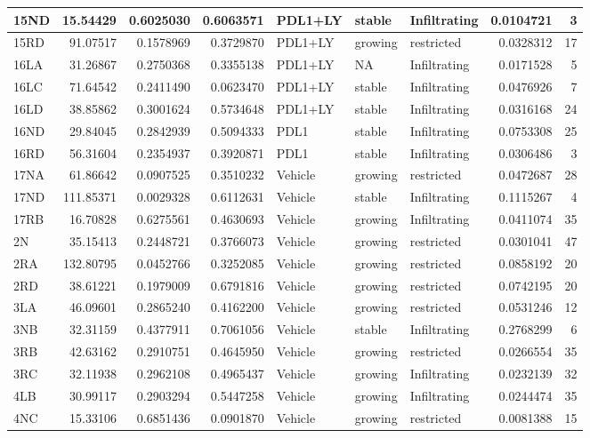 \documentclass[
]{book}
\begin{document}
\begin{tabular}{l|r|r|r|l|l|l|r|r}
\hline
15ND & 15.54429 & 0.6025030 & 0.6063571 & PDL1+LY & stable & Infiltrating & 0.0104721 & 3\\
\hline
15RD & 91.07517 & 0.1578969 & 0.3729870 & PDL1+LY & growing & restricted & 0.0328312 & 17\\
\hline
16LA & 31.26867 & 0.2750368 & 0.3355138 & PDL1+LY & NA & Infiltrating & 0.0171528 & 5\\
\hline
16LC & 71.64542 & 0.2411490 & 0.0623470 & PDL1+LY & stable & Infiltrating & 0.0476926 & 7\\
\hline
16LD & 38.85862 & 0.3001624 & 0.5734648 & PDL1+LY & stable & Infiltrating & 0.0316168 & 24\\
\hline
16ND & 29.84045 & 0.2842939 & 0.5094333 & PDL1 & stable & Infiltrating & 0.0753308 & 25\\
\hline
16RD & 56.31604 & 0.2354937 & 0.3920871 & PDL1 & stable & Infiltrating & 0.0306486 & 3\\
\hline
17NA & 61.86642 & 0.0907525 & 0.3510232 & Vehicle & growing & restricted & 0.0472687 & 28\\
\hline
17ND & 111.85371 & 0.0029328 & 0.6112631 & Vehicle & stable & Infiltrating & 0.1115267 & 4\\
\hline
17RB & 16.70828 & 0.6275561 & 0.4630693 & Vehicle & growing & Infiltrating & 0.0411074 & 35\\
\hline
2N & 35.15413 & 0.2448721 & 0.3766073 & Vehicle & growing & restricted & 0.0301041 & 47\\
\hline
2RA & 132.80795 & 0.0452766 & 0.3252085 & Vehicle & growing & restricted & 0.0858192 & 20\\
\hline
2RD & 38.61221 & 0.1979009 & 0.6791816 & Vehicle & growing & restricted & 0.0742195 & 20\\
\hline
3LA & 46.09601 & 0.2865240 & 0.4162200 & Vehicle & growing & restricted & 0.0531246 & 12\\
\hline
3NB & 32.31159 & 0.4377911 & 0.7061056 & Vehicle & stable & Infiltrating & 0.2768299 & 6\\
\hline
3RB & 42.63162 & 0.2910751 & 0.4645950 & Vehicle & growing & restricted & 0.0266554 & 35\\
\hline
3RC & 32.11938 & 0.2962108 & 0.4965437 & Vehicle & growing & Infiltrating & 0.0232139 & 32\\
\hline
4LB & 30.99117 & 0.2903294 & 0.5447258 & Vehicle & growing & Infiltrating & 0.0244474 & 35\\
\hline
4NC & 15.33106 & 0.6851436 & 0.0901870 & Vehicle & growing & restricted & 0.0081388 & 15\\

\end{tabular}
\end{document}

